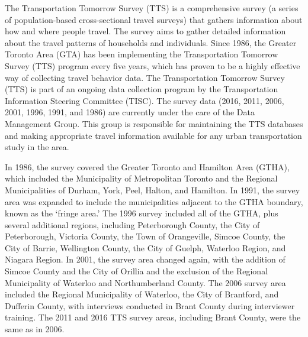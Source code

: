 \documentclass[
11pt, %
oneside, %
english, %
singlespacing, %
]{macthesis} %
\begin{document}
The Transportation Tomorrow Survey (TTS) is a comprehensive survey (a series of population-based cross-sectional travel surveys) that gathers information about how and where people travel. The survey aims to gather detailed information about the travel patterns of households and individuals. Since 1986, the Greater Toronto Area (GTA) has been implementing the Transportation Tomorrow Survey (TTS) program every five years, which has proven to be a highly effective way of collecting travel behavior data. The Transportation Tomorrow Survey (TTS) is part of an ongoing data collection program by the Transportation Information Steering Committee (TISC). The survey data (2016, 2011, 2006, 2001, 1996, 1991, and 1986) are currently under the care of the Data Management Group. This group is responsible for maintaining the TTS databases and making appropriate travel information available for any urban transportation study in the area.

In 1986, the survey covered the Greater Toronto and Hamilton Area (GTHA), which included the Municipality of Metropolitan Toronto and the Regional Municipalities of Durham, York, Peel, Halton, and Hamilton. In 1991, the survey area was expanded to include the municipalities adjacent to the GTHA boundary, known as the `fringe area.' The 1996 survey included all of the GTHA, plus several additional regions, including Peterborough County, the City of Peterborough, Victoria County, the Town of Orangeville, Simcoe County, the City of Barrie, Wellington County, the City of Guelph, Waterloo Region, and Niagara Region. In 2001, the survey area changed again, with the addition of Simcoe County and the City of Orillia and the exclusion of the Regional Municipality of Waterloo and Northumberland County. The 2006 survey area included the Regional Municipality of Waterloo, the City of Brantford, and Dufferin County, with interviews conducted in Brant County during interviewer training. The 2011 and 2016 TTS survey areas, including Brant County, were the same as in 2006.
\end{document}

